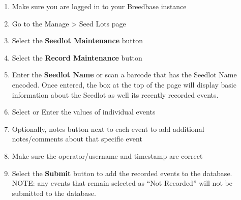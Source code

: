 \documentclass[
  12pt,
]{book}
\providecommand{\tightlist}{%
  \setlength{\itemsep}{0pt}\setlength{\parskip}{0pt}}
\begin{document}
\begin{enumerate}
\def\labelenumi{\arabic{enumi}.}
\tightlist
\item
  Make sure you are logged in to your Breedbase instance
\item
  Go to the Manage \textgreater{} Seed Lots page
\item
  Select the \textbf{Seedlot Maintenance} button
\item
  Select the \textbf{Record Maintenance} button
\item
  Enter the \textbf{Seedlot Name} or scan a barcode that has the Seedlot Name encoded. Once entered, the box at the top of the page will display basic information about the Seedlot as well its recently recorded events.
\item
  Select or Enter the values of individual events
\item
  Optionally, notes button next to each event to add additional notes/comments about that specific event
\item
  Make sure the operator/username and timestamp are correct
\item
  Select the \textbf{Submit} button to add the recorded events to the database. NOTE: any events that remain selected as ``Not Recorded'' will not be submitted to the database.
\end{enumerate}
\end{document}
